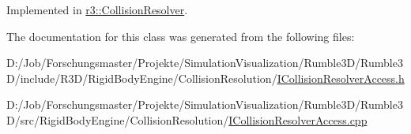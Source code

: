 Implemented in \mbox{\hyperlink{classr3_1_1_collision_resolver_a134da5221d60b34c568f7de29c9d0a58}{r3\+::\+Collision\+Resolver}}.



The documentation for this class was generated from the following files\+:\begin{DoxyCompactItemize}
\item 
D\+:/\+Job/\+Forschungsmaster/\+Projekte/\+Simulation\+Visualization/\+Rumble3\+D/\+Rumble3\+D/include/\+R3\+D/\+Rigid\+Body\+Engine/\+Collision\+Resolution/\mbox{\hyperlink{_i_collision_resolver_access_8h}{I\+Collision\+Resolver\+Access.\+h}}\item 
D\+:/\+Job/\+Forschungsmaster/\+Projekte/\+Simulation\+Visualization/\+Rumble3\+D/\+Rumble3\+D/src/\+Rigid\+Body\+Engine/\+Collision\+Resolution/\mbox{\hyperlink{_i_collision_resolver_access_8cpp}{I\+Collision\+Resolver\+Access.\+cpp}}\end{DoxyCompactItemize}

